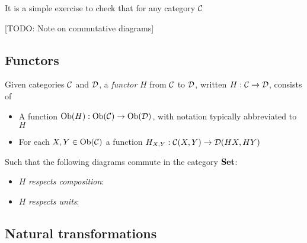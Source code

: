\begin{remark}
    It is a simple exercise to check that for any category $\mathcal{C}$
\end{remark}

[TODO: Note on commutative diagrams]

\subsection{Functors}

\begin{defin}
    Given categories $\mathcal{C}$ and $\mathcal{D}$, a \emph{functor} $H$ from $\mathcal{C}$ to $\mathcal{D}$, written $H : \mathcal{C} \to \mathcal{D}$, consists of
    \begin{itemize}
        \item A function $\text{Ob}(H) : \text{Ob}(\mathcal{C}) \to \text{Ob}(\mathcal{D})$, with notation typically abbreviated to $H$
        \item For each $X, Y \in \text{Ob}(\mathcal{C})$ a function $H_{X,Y} : \mathcal{C}(X, Y) \to \mathcal{D}(HX,HY)$
    \end{itemize}
    Such that the following diagrams commute in the category ${\normalfont\textbf{Set}}$:
    \begin{itemize}
        \item $H$ \textit{respects composition}:
        \begin{center}
        \end{center}
        \item $H$ \textit{respects units}:
        \begin{center}
        \end{center}
    \end{itemize}
\end{defin}

\subsection{Natural transformations}

